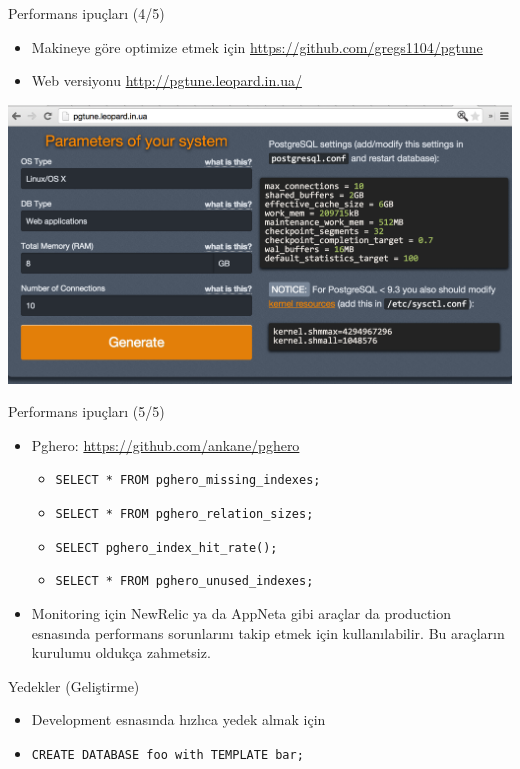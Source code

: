 \documentclass[presentation]{beamer}
\begin{document}
\begin{frame}[label=sec-15]{Performans ipuçları (4/5)}
\begin{itemize}
\item Makineye göre optimize etmek için \url{https://github.com/gregs1104/pgtune}
\item Web versiyonu \url{http://pgtune.leopard.in.ua/}
\end{itemize}

\includegraphics[width=.9\linewidth]{./pgtune.png}
\end{frame}


\begin{frame}[fragile,label=sec-16]{Performans ipuçları (5/5)}
 \begin{itemize}
\item Pghero: \url{https://github.com/ankane/pghero}
\begin{itemize}
\item \texttt{SELECT * FROM pghero\_missing\_indexes;}
\item \texttt{SELECT * FROM pghero\_relation\_sizes;}
\item \texttt{SELECT pghero\_index\_hit\_rate();}
\item \texttt{SELECT * FROM pghero\_unused\_indexes;}
\end{itemize}
\item Monitoring için NewRelic ya da AppNeta gibi araçlar da production esnasında
performans sorunlarını takip etmek için kullanılabilir. Bu araçların kurulumu
oldukça zahmetsiz.
\end{itemize}
\end{frame}

\begin{frame}[fragile,label=sec-17]{Yedekler (Geliştirme)}
 \begin{itemize}
\item Development esnasında hızlıca yedek almak için

\item \texttt{CREATE DATABASE foo with TEMPLATE bar;}
\end{itemize}
\end{frame}
\end{document}
